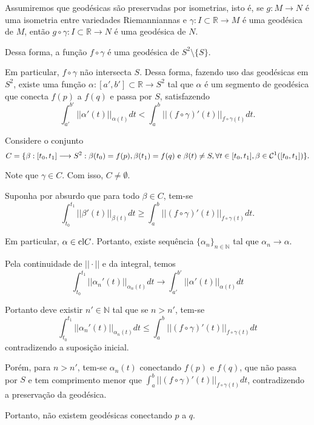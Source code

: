 \documentclass[twoside,openright,titlepage,numbers=noenddot,headinclude,  lineheaders footinclude=true,cleardoublepage=empty,BCOR=5mm,paper=a4,fontsize=12pt ]{scrbook}
\newcommand{\R}{\mathbb R}
\newcommand{\N}{\mathbb N}
\begin{document}
Assumiremos que geodésicas são preservadas por isometrias, isto é, se $g: M \longrightarrow N$ é uma isometria entre variedades Riemanniannas e $\gamma: I \subset \R \longrightarrow M$ é uma geodésica de $M$, então $g \circ \gamma: I \subset \R \longrightarrow N$ é uma geodésica de $N$.

Dessa forma, a função $f \circ \gamma$ é uma geodésica de $S^2 \setminus \{S\}$. 

Em particular, $f \circ \gamma$ não intersecta $S$. Dessa forma, fazendo uso das geodésicas em $S^2$, existe uma função $\alpha: [a',b'] \subset \R \longrightarrow S^2$ tal que $\alpha$ é um segmento de geodésica que conecta $f(p)$ a $f(q)$ e passa por $S$, satisfazendo
\begin{equation*}
     \int_{a'}^{b'} ||\alpha'(t)||_{\alpha(t)}dt < \int_{a}^b ||(f\circ \gamma)'(t)||_{f \circ \gamma(t)}dt.
\end{equation*}

Considere o conjunto 
\begin{equation*}
    C = \{\beta:[t_0,t_1] \longrightarrow S^2: \beta(t_0)=f(p),\beta(t_1)=f(q)\hbox{ e }\beta(t) \neq S, \forall t \in [t_0,t_1], \beta \in \mathcal{C}^1([t_0,t_1])\}. 
\end{equation*}

Note que $\gamma \in C$. Com isso, $C \neq \emptyset.$ 

Suponha por absurdo que para todo $\beta \in C$, tem-se 
\begin{equation*}
    \int_{t_0}^{t_1} ||\beta'(t)||_{\beta(t)}dt \geq \int_{a}^b ||(f\circ \gamma)'(t)||_{f \circ \gamma(t)}dt. 
\end{equation*}

Em particular, $\alpha \in \hbox{cl}C$. Portanto, existe sequência $\{\alpha_n\}_{n \in \N}$ tal que $\alpha_n \longrightarrow \alpha$. 

Pela continuidade de $|| \cdot ||$ e da integral, temos  
\begin{equation*}
    \int_{t_0}^{t_1}||\alpha_n'(t)||_{\alpha_n(t)}dt \longrightarrow \int_{a'}^{b'}||\alpha'(t)||_{\alpha(t)}dt
\end{equation*}

Portanto deve existir $n' \in \N$ tal que se $n > n'$, tem-se
\begin{equation*}
    \int_{t_0}^{t_1}||\alpha_n'(t)||_{\alpha_n(t)}dt\leq \int_{a}^b ||(f\circ \gamma)'(t)||_{f \circ \gamma(t)}dt
\end{equation*}
contradizendo a suposição inicial. 

Porém, para $n >n'$, tem-se $\alpha_n(t)$ conectando $f(p)$ e $f(q)$, que não passa por $S$ e tem comprimento menor que $ \int_{a}^b ||(f\circ \gamma)'(t)||_{f \circ \gamma(t)}dt$, contradizendo a preservação da geodésica. 

Portanto, não existem geodésicas conectando $p$ a $q$. 
\end{document}
